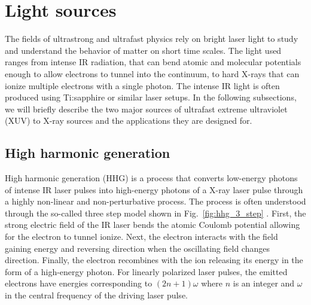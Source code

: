\section{Light sources}

The fields of ultrastrong and ultrafast physics rely on bright laser light to study and understand the behavior of matter on short time scales. The light used ranges from intense IR radiation, that can bend atomic and molecular potentials enough to allow electrons to tunnel into the continuum, to hard X-rays that can ionize multiple electrons with a single photon. The intense IR light is often produced  using Ti:sapphire or similar laser setups. In the following subsections, we will briefly describe the two major sources of ultrafast extreme ultraviolet (XUV) to X-ray sources and the applications they are designed for.

\subsection{High harmonic generation} %
\label{sub:high_harmonic_generation}
High harmonic generation (HHG) is a process that converts low-energy photons of intense IR laser pulses into high-energy photons of a X-ray laser pulse through a highly non-linear and non-perturbative process. The process is often understood through the so-called three step model shown in Fig.~\ref{fig:hhg_3_step} \cite{lewenstein1994,corkum1994,popmintchev2010}. First, the strong electric field of the IR laser bends the atomic Coulomb potential allowing for the electron to tunnel ionize. Next, the electron interacts with the field gaining energy and reversing direction when the oscillating field changes direction. Finally, the electron recombines with the ion releasing its energy in the form of a high-energy photon. For linearly polarized laser pulses, the emitted electrons have energies corresponding to $(2n+1)\omega$ where $n$ is an integer and $\omega$ in the central frequency of the driving laser pulse. 

